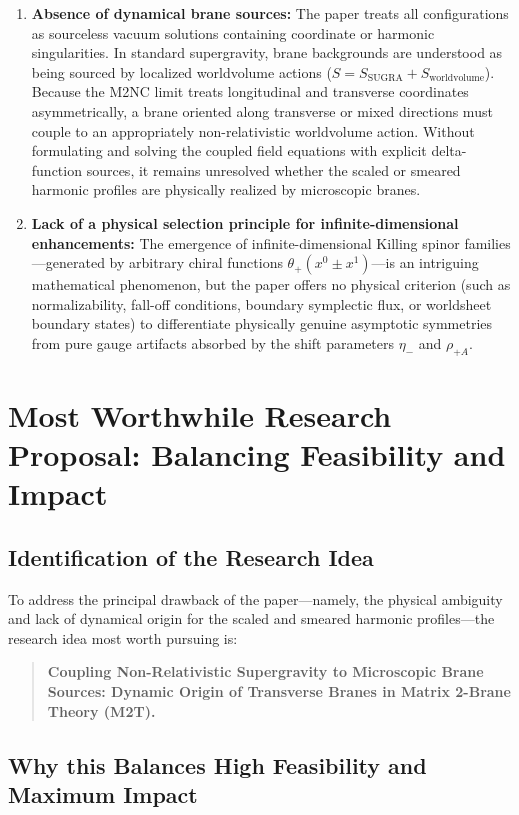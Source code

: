 \documentclass[11pt,a4paper]{article}
\begin{document}
\begin{enumerate}
    \item \textbf{Absence of dynamical brane sources:}
    The paper treats all configurations as sourceless vacuum solutions containing coordinate or harmonic singularities. In standard supergravity, brane backgrounds are understood as being sourced by localized worldvolume actions ($S = S_{\text{SUGRA}} + S_{\text{worldvolume}}$). Because the M2NC limit treats longitudinal and transverse coordinates asymmetrically, a brane oriented along transverse or mixed directions must couple to an appropriately non-relativistic worldvolume action. Without formulating and solving the coupled field equations with explicit delta-function sources, it remains unresolved whether the scaled or smeared harmonic profiles are physically realized by microscopic branes.

    \item \textbf{Lack of a physical selection principle for infinite-dimensional enhancements:}
    The emergence of infinite-dimensional Killing spinor families—generated by arbitrary chiral functions $\theta_+(x^0 \pm x^1)$—is an intriguing mathematical phenomenon, but the paper offers no physical criterion (such as normalizability, fall-off conditions, boundary symplectic flux, or worldsheet boundary states) to differentiate physically genuine asymptotic symmetries from pure gauge artifacts absorbed by the shift parameters $\eta_-$ and $\rho_{+A}$.
\end{enumerate}

\section{Most Worthwhile Research Proposal: Balancing Feasibility and Impact}

\subsection{Identification of the Research Idea}
To address the principal drawback of the paper—namely, the physical ambiguity and lack of dynamical origin for the scaled and smeared harmonic profiles—the research idea most worth pursuing is:
\begin{quote}
\textbf{Coupling Non-Relativistic Supergravity to Microscopic Brane Sources: Dynamic Origin of Transverse Branes in Matrix 2-Brane Theory (M2T).}
\end{quote}

\subsection{Why this Balances High Feasibility and Maximum Impact}
\end{document}
